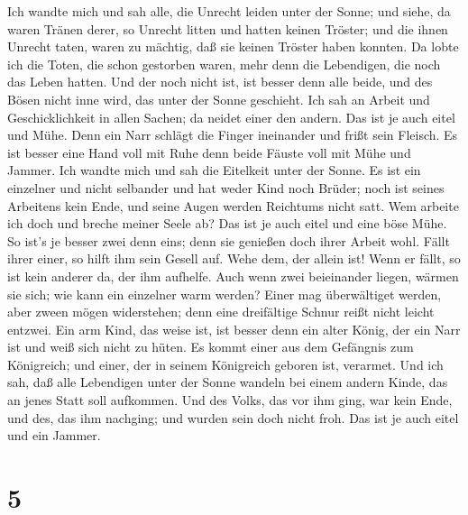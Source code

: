 Ich wandte mich und sah alle, die Unrecht leiden unter der
Sonne; und siehe, da waren Tränen derer, so Unrecht litten und hatten
keinen Tröster; und die ihnen Unrecht taten, waren zu mächtig, daß sie
keinen Tröster haben konnten.  Da lobte ich die Toten, die
schon gestorben waren, mehr denn die Lebendigen, die noch das Leben
hatten.  Und der noch nicht ist, ist besser denn alle beide,
und des Bösen nicht inne wird, das unter der Sonne geschieht.
 Ich sah an Arbeit und Geschicklichkeit in allen Sachen; da
neidet einer den andern. Das ist je auch eitel und Mühe. 
Denn ein Narr schlägt die Finger ineinander und frißt sein Fleisch.
 Es ist besser eine Hand voll mit Ruhe denn beide Fäuste
voll mit Mühe und Jammer.  Ich wandte mich und sah die
Eitelkeit unter der Sonne.  Es ist ein einzelner und nicht
selbander und hat weder Kind noch Brüder; noch ist seines Arbeitens kein
Ende, und seine Augen werden Reichtums nicht satt. Wem arbeite ich doch
und breche meiner Seele ab? Das ist je auch eitel und eine böse Mühe.
 So ist's je besser zwei denn eins; denn sie genießen doch
ihrer Arbeit wohl.  Fällt ihrer einer, so hilft ihm sein
Gesell auf. Wehe dem, der allein ist! Wenn er fällt, so ist kein anderer
da, der ihm aufhelfe.  Auch wenn zwei beieinander liegen,
wärmen sie sich; wie kann ein einzelner warm werden?  Einer
mag überwältiget werden, aber zween mögen widerstehen; denn eine
dreifältige Schnur reißt nicht leicht entzwei.  Ein arm
Kind, das weise ist, ist besser denn ein alter König, der ein Narr ist
und weiß sich nicht zu hüten.  Es kommt einer aus dem
Gefängnis zum Königreich; und einer, der in seinem Königreich geboren
ist, verarmet.  Und ich sah, daß alle Lebendigen unter der
Sonne wandeln bei einem andern Kinde, das an jenes Statt soll aufkommen.
 Und des Volks, das vor ihm ging, war kein Ende, und des,
das ihm nachging; und wurden sein doch nicht froh. Das ist je auch eitel
und ein Jammer.

\hypertarget{section-4}{%
\section{5}\label{section-4}}

